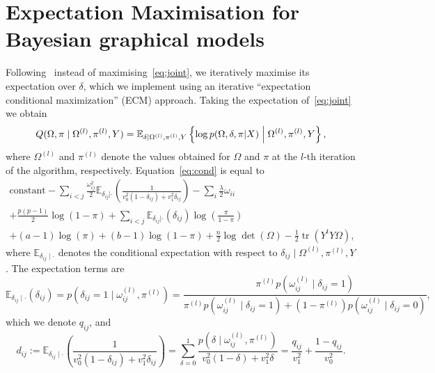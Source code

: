 \documentclass[a4paper, 11pt, oneside]{report}
\DeclareMathOperator{\tr}{tr}
\newcommand{\E}{\mathbb{E}}
\newcommand{\1}{\mathds{1}}
\newcommand{\powl}{^{(l)}}
\begin{document}
\section{Expectation Maximisation for Bayesian graphical models}
Following~\citet{limcco-2017} instead of maximising~\eqref{eq:joint}, we
iteratively maximise its expectation over $\delta$, which we implement using an iterative ``expectation conditional maximization'' (ECM) approach. Taking the expectation
of~\eqref{eq:joint} we obtain
\begin{equation}\label{eq:cond}
	Q(\Omega, \pi \mid \Omega\powl, \pi\powl, Y) = \mathbb{E}_{\delta \mid
		\Omega\powl, \pi\powl, Y}\left\{\log p(\Omega, \delta, \pi| X) \Bigm\vert
	\Omega\powl, \pi\powl, Y\right\},
\end{equation}
where $\Omega\powl$ and $\pi\powl$ denote the values obtained for $\Omega$ and
$\pi$ at the $l$-th iteration of the algorithm, respectively.
Equation~\eqref{eq:cond} is equal to
\begin{multline}
	\text{constant} - \sum_{i<j} \frac{\omega_{ij}^2}{2} \E_{\delta_{ij} |
		\cdot}\left(\frac{1}{v_0^2 (1 - \delta_{ij}) + v_1^2 \delta_{ij}}\right) -
	\sum_i \frac{\lambda}{2} \omega_{ii}
	\\
	+ \frac{p(p-1)}{2}  \log(1 - \pi) + \sum_{i<j} \E_{\delta_{ij} |
		\cdot}(\delta_{ij}) \log\left(\frac{\pi}{1-\pi}\right)
	\\
	+ (a - 1) \log(\pi) + (b - 1) \log(1 - \pi)
	+ \frac{n}{2} \log\det(\Omega) - \frac{1}{2} \tr(Y^t Y \Omega),
\end{multline}
where $\mathbb{E}_{\delta_{ij} \mid \cdot}$ denotes the conditional expectation with respect
to $\delta_{ij} \mid \Omega\powl, \pi\powl, Y$.
The expectation terms are
\begin{equation}\label{eq:qij}
	\E_{\delta_{ij} \mid \cdot}(\delta_{ij}) = p\left(\delta_{ij} = 1 \mid \omega_{ij}\powl, \pi\powl\right)
	= \frac{ \pi\powl p\left(\omega_{ij}\powl \mid \delta_{ij} = 1\right)}{\pi\powl p\left(\omega_{ij}\powl \mid \delta_{ij} = 1\right) +
		\left(1 - \pi\powl\right) p\left(\omega_{ij}\powl \mid \delta_{ij} = 0\right)},
\end{equation}
which we denote $q_{ij}$, and
\begin{equation}\label{eq:dij}
	d_{ij} := \E_{\delta_{ij} \mid \cdot}\left(\frac{1}{v_0^2 (1 -
			\delta_{ij}) + v_1^2 \delta_{ij}}\right) = \sum_{\delta = 0}^1
	\frac{p\left(\delta \mid \omega_{ij}\powl, \pi\powl\right)}{v_0^2 (1 - \delta) +
		v_1^2 \delta} = \frac{q_{ij}}{v_1^2} + \frac{1 - q_{ij}}{v_0^2}.
\end{equation}
\end{document}
